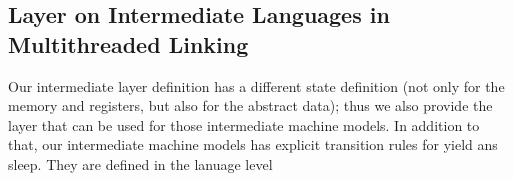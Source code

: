 

\subsection{Layer on Intermediate Languages in Multithreaded Linking}
\label{chapter:certikos:subsec:layer-on-intermediate-languages-in-multithreaded-linking}

Our intermediate layer definition has a different state definition (not only for the memory and registers, but also for the abstract data); thus we also provide the 
layer that can be used for those intermediate machine models. 
In addition to that, our intermediate machine models has explicit 
transition rules for yield ans sleep. 
They are defined in the lanuage level 

